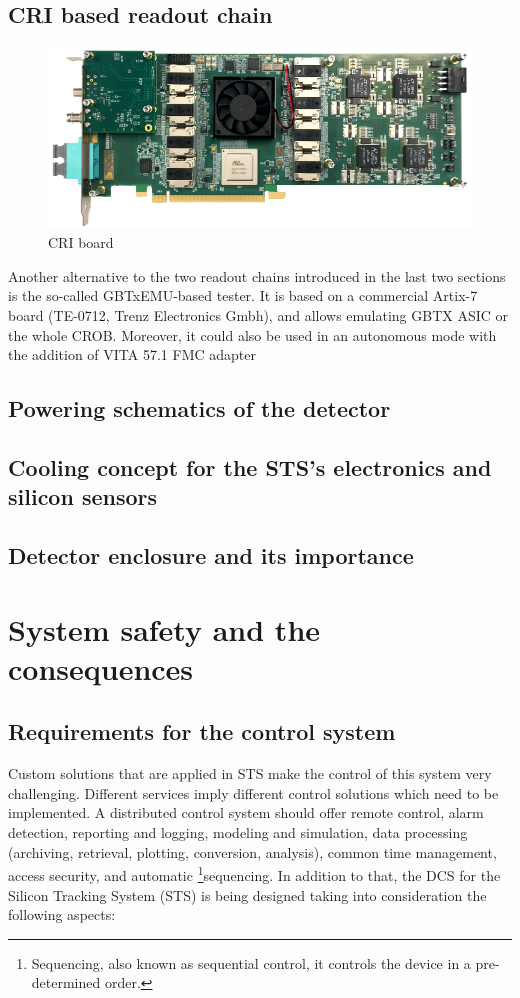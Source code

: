 \subsection{CRI based readout chain}
\begin{figure}[!h]
\centering
\includegraphics[width=0.65\columnwidth]{Chapter2/images/cri_board_atlas.pdf}
\caption{CRI board}
\label{fig_cri_board}
\end{figure}

\label{tester}
Another alternative to the two readout chains introduced in the last two sections is the so-called GBTxEMU-based tester. It is based on a commercial Artix-7 board (TE-0712, Trenz Electronics Gmbh), and allows emulating GBTX ASIC or the whole CROB. Moreover, it could also be used in an autonomous mode with the addition of VITA  57.1 FMC adapter
\subsection{Powering schematics of the detector}
\label{powering}
\subsection{Cooling concept for the STS's electronics and silicon sensors}
\label{cooling}

\subsection{Detector enclosure and its importance}
\section{System safety and the consequences}
\subsection{Requirements for the control system}
\label{sys:req}
Custom solutions that are applied in \gls{STS} make the control of this system very challenging. Different services imply different control solutions which need to be implemented.
A distributed control system should offer remote control, alarm detection, reporting and logging, modeling and simulation, data processing (archiving, retrieval, plotting, conversion, analysis), common time management, access security, and automatic \footnote{Sequencing, also known as sequential control, it controls the device in a pre-determined order.}{sequencing}.
In addition to that, the \gls{DCS} for the Silicon Tracking System (\gls{STS}) is being designed taking into consideration the following aspects:


